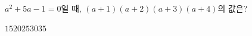 $a^2+5a-1=0$일 때, $(a+1)(a+2)(a+3)(a+4)$의 값은?
\begin{choices32}{$15$}{$20$}{$25$}{$30$}{$35$}\end{choices32}
